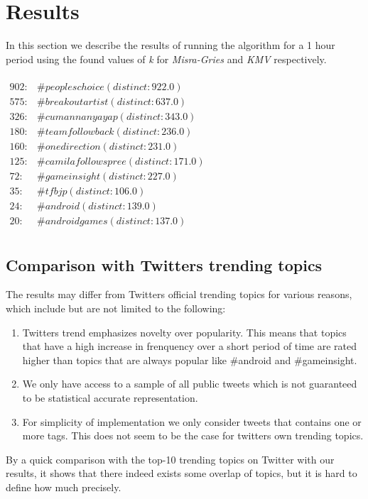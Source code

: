 \section{Results}\label{results}
In this section we describe the results of running the algorithm for a 1 hour period using the found values of \textit{k} for \textit{Misra-Gries} and \textit{KMV} respectively.
\\\\
$\begin{array}{ll}
    902: & \#peopleschoice (distinct: 922.0) \\
    575: & \#breakoutartist (distinct: 637.0) \\
    326: & \#cumannanyayap (distinct: 343.0) \\
    180: & \#teamfollowback (distinct: 236.0) \\
    160: & \#onedirection (distinct: 231.0) \\
    125: & \#camilafollowspree (distinct: 171.0) \\
    72: & \#gameinsight (distinct: 227.0) \\
    35: & \#tfbjp (distinct: 106.0) \\
    24: & \#android (distinct: 139.0) \\
    20: & \#androidgames (distinct: 137.0) \\
\end{array}$

\subsection{Comparison with Twitters trending topics}\label{twitter-result}
The results may differ from Twitters official trending topics for various reasons, which include but are not limited to the following: 
\\
\begin{enumerate}
	\item Twitters trend emphasizes novelty over popularity. This means that topics that have a high increase in frenquency over a short period of time are rated higher than topics that are always popular like \#android and \#gameinsight. 
	\item We only have access to a sample of all public tweets which is not guaranteed to be statistical accurate representation.
    \item For simplicity of implementation we only consider tweets that contains one or more tags. This does not seem to be the case for twitters own trending topics.
\end{enumerate}

By a quick comparison with the top-10 trending topics on Twitter with our results, it shows that there indeed exists some overlap of topics, but it is hard to define how much precisely.


